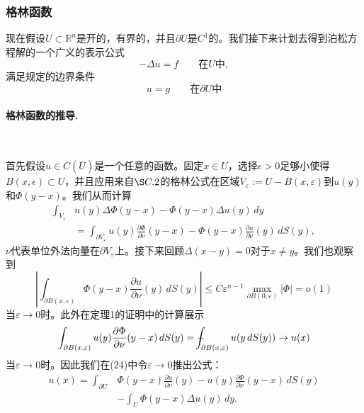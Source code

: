 \documentclass[leqno]{article}
\def\Xint#1{\mathchoice
	{\XXint\displaystyle\textstyle{#1}}%
	{\XXint\textstyle\scriptstyle{#1}}%
	{\XXint\scriptstyle\scriptscriptstyle{#1}}%
	{\XXint\scriptscriptstyle\scriptscriptstyle{#1}}%
	\!\int}
\def\XXint#1#2#3{{\setbox0=\hbox{$#1{#2#3}{\int}$ }
		\vcenter{\hbox{$#2#3$ }}\kern-.6\wd0}}
\def\dashint{\Xint-}
\numberwithin{equation}{subsection}%
\begin{document}
\subsubsection{格林函数}
现在假设$U\subset\mathbb{R}^{n}$是开的，有界的，并且$\partial U$是$C^{1}$的。我们接下来计划去得到泊松方程解的一个广义的表示公式
\begin{equation*}
-\Delta u=f\qquad\text{在}U\text{中},
\end{equation*}
满足规定的边界条件
\begin{equation*}
u=g\qquad\text{在}\partial U\text{中}
\end{equation*}

\paragraph{格林函数的推导.}~{}
\par
首先假设$u\in C(\bar{U})$是一个任意的函数。固定$x\in U$，选择$\epsilon>0$足够小使得$B(x,\epsilon)\subset U$，并且应用来自$\S C.2$的格林公式在区域$V_{\varepsilon}:=U-B(x,\varepsilon)$到$u(y)$和$\Phi (y-x)$。我们从而计算
\begin{equation}
\begin{aligned}
\int_{V_{\varepsilon}}&u(y)\Delta\Phi(y-x)-\Phi(y-x)\Delta u(y)\,dy\\
&=\int_{\partial V_{\varepsilon}}u(y)\frac{\partial\Phi}{\partial\nu}(y-x)-\Phi(y-x)\frac{\partial u}{\partial\nu}(y)\,dS(y),
\end{aligned}
\end{equation}
$\nu$代表单位外法向量在$\partial V_{\varepsilon}$上。接下来回顾$\Delta(x-y)=0$对于$x\neq y$。我们也观察到
\begin{equation*}
|\int_{\partial B(x,\varepsilon)}\Phi(y-x)\frac{\partial u}{\partial\nu}(y)\,dS(y)|\leq C\varepsilon^{n-1}\max_{\partial B(0,\varepsilon)}|\Phi|=o(1)
\end{equation*}
当$\varepsilon\rightarrow 0$时。此外在定理1的证明中的计算展示
\begin{equation*}
\int_{\partial B(x,\varepsilon)}u(y)\frac{\partial \Phi}{\partial\nu}(y-x)\,dS(y)=\dashint_{\partial B(x,\varepsilon)}u(y\,dS(y))\rightarrow u(x)
\end{equation*}
当$\varepsilon\rightarrow 0$时。因此我们在(24)中令$\varepsilon\rightarrow 0$推出公式：
\begin{equation}
\begin{aligned}
u(x)=\int_{\partial U}&\Phi(y-x)\frac{\partial u}{\partial\nu}(y)-u(y)\frac{\partial\Phi}{\partial\nu}(y-x)\,dS(y)\\&-\int_{U}\Phi(y-x)\Delta u(y)\,dy.
\end{aligned}
\end{equation}
\end{document}
